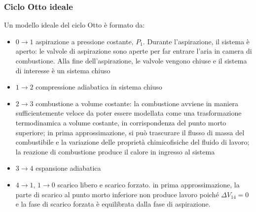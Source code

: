 \documentclass[letterpaper,10pt,italian]{jupyterBook}
\begin{document}
\subsubsection{Ciclo Otto ideale}
\label{\detokenize{ch/thermodynamics/heat-engine-otto:ciclo-otto-ideale}}
\sphinxAtStartPar
Un modello ideale del ciclo Otto è formato da:
\begin{itemize}
\item {} 
\sphinxAtStartPar
\(0 \rightarrow 1\) aspirazione a pressione costante, \(P_1\). Durante l’aspirazione, il sistema è aperto: le valvole di aspirazione sono aperte per far entrare l’aria in camera di combustione. Alla fine dell’aspirazione, le valvole vengono chiuse e il sistema di interesse è un sistema chiuso

\item {} 
\sphinxAtStartPar
\(1 \rightarrow 2\) compressione adiabatica in sistema chiuso

\item {} 
\sphinxAtStartPar
\(2 \rightarrow 3\) combustione a volume costante: la combustione avviene in maniera sufficientemente veloce da poter essere modellata come una trasformazione termodinamica a volume costante, in corrispondenza del punto morto superiore; in prima approssimazione, si può trascurare il flusso di massa del combustibile e la variazione delle proprietà chimico\sphinxhyphen{}fisiche del fluido di lavoro; la reazione di combustione produce il calore in ingresso al sistema

\item {} 
\sphinxAtStartPar
\(3 \rightarrow 4\) espansione adiabatica

\item {} 
\sphinxAtStartPar
\(4 \rightarrow 1\), \(1 \rightarrow 0\) scarico libero e scarico forzato.  in prima approssimazione, la parte di scarico al punto morto inferiore non produce lavoro poiché \(\Delta V_{14} = 0\) e la fase di scarico forzata è equilibrata dalla fase di aspirazione.

\end{itemize}
\end{document}
